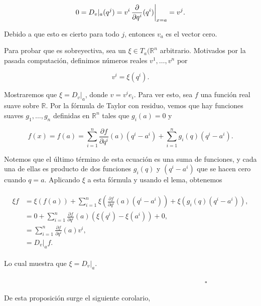 \documentclass[a4paper,10pt]{article}
\numberwithin{equation}{section}
\newcommand{\zerodel}{.\kern-\nulldelimiterspace}
\begin{document}
\begin{equation}
 0 = D_v|_a (q^j) = v^i \left\zerodel\frac{\partial}{\partial q^i}(q^i)\right|_{x=a} = v^j.
\end{equation}

Debido a que esto es cierto para todo $j$, entonces $v_a$ es el vector 
cero. 

\vspace{.3cm}

Para probar que es sobreyectiva, sea un $\xi \in T_a(\mathbb{R}^n$ arbitrario. 
Motivados por la pasada computación, definimos números reales $v^1,\dots,v^n$ 
por 

\begin{equation}
 v^i = \xi(q^i).
\end{equation}

Mostraremos que $\xi = D_v|_a$, donde $v = v^ie_i$. Para ver esto, 
sea $f$ una función real suave sobre $\mathbb{R}$. Por la fórmula 
de Taylor con residuo, vemos que hay funciones suaves $g_1,\dots,g_n$ 
definidas en $\mathbb{R}^n$ tales que $g_i(a) = 0$ y 

\begin{equation}
 f(x) = f(a) = \sum_{i=1}^n \frac{\partial f}{\partial q^i}(a) (q^i - a^i) 
 + \sum_{i=1}^n g_i(q) (q^i - a^i).
\end{equation}

Notemos que el último término de esta ecuación es una suma de funciones, 
y cada una de ellas es producto de dos funciones $g_i(q)$ y $(q^i - a^i)$ que 
se hacen cero cuando $q=a$. Aplicando $\xi$ a esta fórmula y usando 
el lema, obtenemos 

\begin{align}
 \begin{split}
  \xi f &= \xi(f(a)) + \sum_{i=1}^n \xi \left( \frac{\partial f}{\partial q^i}(a) (q^i - a^i)\right) 
  + \xi (g_i(q) (q^i - a^i)), \\
	&= 0 + \sum_{i=1}^n \frac{\partial f}{\partial q^i}(a)(\xi(q^i)- \xi(a^i)) + 0, \\
	&= \sum_{i=1}^n \frac{\partial f}{\partial q^i}(a)v^i, \\
	&= D_v|_a f.
 \end{split}
\end{align}

Lo cual muestra que $\xi = D_v|_a$.

$\hspace{12cm} \square$

De esta proposición surge el siguiente corolario, 
\end{document}
